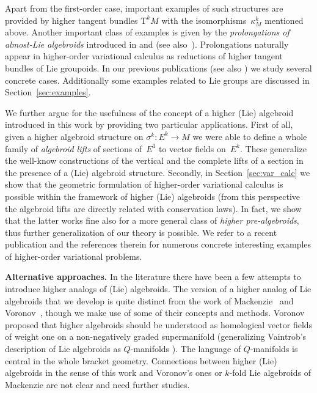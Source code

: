 \documentclass[10pt,a4paper]{amsart}
\newcommand{\ra}{\rightarrow}
\newcommand{\prealg}{pre-algebroid} %
\newcommand{\TT}[1]{\mathrm{T}^{#1}} %
\numberwithin{equation}{section}
\theoremstyle{definition}
\begin{document}
 Apart from the first-order case, important examples of such structures are provided by higher tangent bundles $\TT{k} M$ with the isomorphisms~$\kappa^k_M$ mentioned above. Another important class of examples is given by the \emph{prolongations of almost-Lie algebroids} introduced in \cite{Col_deDiego_seminar_2011} and \cite{MJ_MR_models_high_alg_2015} (see also~\cite{Saunders_2004}). Prolongations naturally appear in higher-order variational calculus as reductions of higher tangent bundles of Lie groupoids. In our previous publications \cite{MJ_MR_prototypes,MJ_MR_models_high_alg_2015} (see also \cite{Martinez_2015}) we study several concrete cases. Additionally some examples related to Lie groups are discussed in Section~\ref{sec:examples}.

We further argue for the usefulness of the concept of a higher (Lie) algebroid introduced in this work by providing two particular applications. First of all, given a higher algebroid structure on $\sigma^k\colon E^k\ra M$ we were able to define a whole family of \emph{algebroid lifts} of sections of~$E^1$ to vector fields on~$E^k$. These generalize the well-know constructions of the vertical and the complete lifts of a section in the presence of a (Lie) algebroid structure. Secondly, in Section~\ref{sec:var_calc} we show that the geometric formulation of higher-order variational calculus is possible within the framework of higher (Lie) algebroids (from this perspective the algebroid lifts are directly related with conservation laws). In fact, we show that the latter works fine also for a more general class of \emph{higher \prealg s}, thus further generalization of our theory is possible. We refer to a recent publication \cite{Colombo_2017} and the references therein for numerous concrete interesting examples of higher-order variational problems.

{\bf Alternative approaches.} In the literature there have been a few attempts to introduce higher analogs of (Lie) algebroids. The version of a higher analog of Lie algebroids that we develop is quite distinct from the work of Mackenzie~\cite{Mackenzie_2011} and Voronov~\cite{Voronov_Q_mfds_high_lie_alg_2010, Voronov_2012}, though we make use of some of their concepts and methods. Voronov \cite{Voronov_Q_mfds_high_lie_alg_2010} proposed that higher algebroids should be understood as homological vector fields of weight one on a non-negatively graded supermanifold (generalizing Vaintrob's description of Lie algebroids as $Q$-manifolds \cite{Vaintrob_1997}). The language of $Q$-manifolds is central in the whole bracket geometry. Connections between higher (Lie) algebroids in the sense of this work and Voronov's ones or $k$-fold Lie algebroids of Mackenzie are not clear and need further studies.
\end{document}
